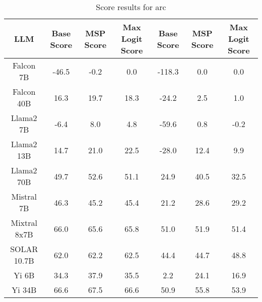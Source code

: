 \renewcommand\arraystretch{1.2}
\begin{table*}
\centering
\begin{tabular}{c|c|c|c|c|c|c}
LLM & Base Score & MSP Score & Max Logit Score & Base Score & MSP Score & Max Logit Score\\ \hline
Falcon 7B & -46.5 & -0.2 & 0.0 & -118.3 & 0.0 & 0.0\\
Falcon 40B & 16.3 & 19.7 & 18.3 & -24.2 & 2.5 & 1.0\\
Llama2 7B & -6.4 & 8.0 & 4.8 & -59.6 & 0.8 & -0.2\\
Llama2 13B & 14.7 & 21.0 & 22.5 & -28.0 & 12.4 & 9.9\\
Llama2 70B & 49.7 & 52.6 & 51.1 & 24.9 & 40.5 & 32.5\\
Mistral 7B & 46.3 & 45.2 & 45.4 & 21.2 & 28.6 & 29.2\\
Mixtral 8x7B & 66.0 & 65.6 & 65.8 & 51.0 & 51.9 & 51.4\\
SOLAR 10.7B & 62.0 & 62.2 & 62.5 & 44.4 & 44.7 & 48.8\\
Yi 6B & 34.3 & 37.9 & 35.5 & 2.2 & 24.1 & 16.9\\
Yi 34B & 66.6 & 67.5 & 66.6 & 50.9 & 55.8 & 53.9\\
\hline
\end{tabular}
\caption{Score results for arc}
\end{table*}
\label{tab:arc_score}
